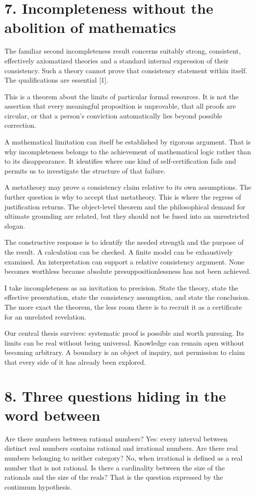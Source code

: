 \documentclass[10pt]{article}
\begin{document}
\clearpage
\section*{7. Incompleteness without the abolition of mathematics}
The familiar second incompleteness result concerns suitably strong, consistent, effectively axiomatized theories and a standard internal expression of their consistency. Such a theory cannot prove that consistency statement within itself. The qualifications are essential [1].

This is a theorem about the limits of particular formal resources. It is not the assertion that every meaningful proposition is unprovable, that all proofs are circular, or that a person's conviction automatically lies beyond possible correction.

A mathematical limitation can itself be established by rigorous argument. That is why incompleteness belongs to the achievement of mathematical logic rather than to its disappearance. It identifies where one kind of self-certification fails and permits us to investigate the structure of that failure.

A metatheory may prove a consistency claim relative to its own assumptions. The further question is why to accept that metatheory. This is where the regress of justification returns. The object-level theorem and the philosophical demand for ultimate grounding are related, but they should not be fused into an unrestricted slogan.

The constructive response is to identify the needed strength and the purpose of the result. A calculation can be checked. A finite model can be exhaustively examined. An interpretation can support a relative consistency argument. None becomes worthless because absolute presuppositionlessness has not been achieved.

I take incompleteness as an invitation to precision. State the theory, state the effective presentation, state the consistency assumption, and state the conclusion. The more exact the theorem, the less room there is to recruit it as a certificate for an unrelated revelation.

Our central thesis survives: systematic proof is possible and worth pursuing. Its limits can be real without being universal. Knowledge can remain open without becoming arbitrary. A boundary is an object of inquiry, not permission to claim that every side of it has already been explored.

\clearpage
\section*{8. Three questions hiding in the word between}
Are there numbers between rational numbers? Yes: every interval between distinct real numbers contains rational and irrational numbers. Are there real numbers belonging to neither category? No, when irrational is defined as a real number that is not rational. Is there a cardinality between the size of the rationals and the size of the reals? That is the question expressed by the continuum hypothesis.
\end{document}
